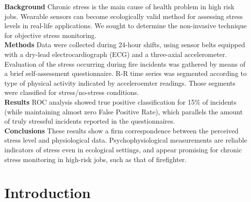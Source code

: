 \documentclass[smallcondensed]{svjour3}
\begin{document}
\textbf{Background} Chronic stress is the main cause of health problem in high risk jobs. Wearable sensors can become ecologically valid method for assessing stress levels in real-life applications. We sought to determine the non-invasive technique for objective stress monitoring.\\
\textbf{Methods} Data were collected during 24-hour shifts, using sensor belts equipped with a dry-lead electrocardiograph (ECG) and a three-axial accelerometer. Evaluation of the stress occurring during fire incidents was gathered by means of a brief self-assessment questionnaire. R-R time series was segmented according to type of physical activity indicated by acceleroemter readings. Those segments were classified for stress/no-stress conditions.\\
\textbf{Results} ROC analysis showed true positive classification for 15\% of incidents (while maintaining almost zero False Positive Rate), which parallels the amount of truly stressful incidents reported in the questionnaires.\\
\textbf{Conclusions} These results show a firm correspondence between the perceived stress level and physiological data. Psychophysiological measurements are reliable indicators of stress even in ecological settings, and appear promising for chronic stress monitoring in high-risk jobs, such as that of firefighter.



\linenumbers

\section{Introduction}
\label{S:Introduction}
\end{document}
